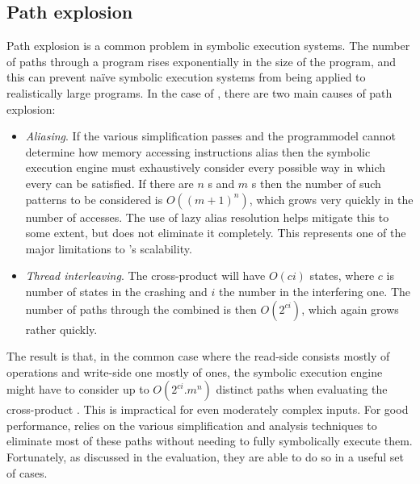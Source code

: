 
\subsection{Path explosion}

Path explosion is a common problem in symbolic execution systems.  The
number of paths through a program rises exponentially in the size of
the program, and this can prevent na\"ive symbolic execution systems
from being applied to realistically large programs.  In the case of
\technique, there are two main causes of path explosion:
\begin{itemize}
\item
  \textit{Aliasing}.  If the various simplification passes and the
  \gls{programmodel} cannot determine how memory accessing
  instructions alias then the symbolic execution engine must
  exhaustively consider every possible way in which every 
  can be satisfied.  If there are $n$ s and $m$
  s then the number of such patterns to be considered is
  $O((m+1)^n)$, which grows very quickly in the number of accesses.
  The use of lazy alias resolution helps mitigate this to some extent,
  but does not eliminate it completely.  This represents one of the
  major limitations to \technique's scalability.
\item
  \textit{Thread interleaving}.  The cross-product {\StateMachine}
  will have $O(ci)$ states, where $c$ is number of states in the
  crashing {\StateMachine} and $i$ the number in the interfering one.
  The number of paths through the combined {\StateMachine} is then
  $O(2^{ci})$, which again grows rather quickly.
\end{itemize}
The result is that, in the common case where the read-side
{\StateMachine} consists mostly of  operations and
write-side one mostly of  ones, the symbolic execution
engine might have to consider up to $O(2^{ci}.m^n)$ distinct paths
when evaluating the cross-product {\StateMachine}.  This is
impractical for even moderately complex inputs.  For good performance,
{\technique} relies on the various simplification and analysis
techniques to eliminate most of these paths without needing to fully
symbolically execute them.  Fortunately, as discussed in the
evaluation, they are able to do so in a useful set of cases.

